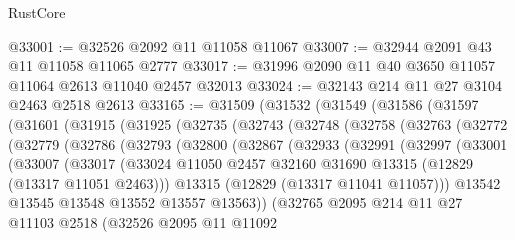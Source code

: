 \begin{lexlean}{RustCore}
\begin{coremodule}
@33001 := @32526 @2092 @11 @11058 @11067
@33007 := @32944 @2091 @43 @11 @11058 @11065 @2777
@33017 := @31996 @2090 @11 @40 @3650 @11057 @11064 @2613 @11040 @2457 @32013
@33024 := @32143 @214 @11 @27 @3104 @2463 @2518 @2613
@33165 := @31509
    (@31532
      (@31549
        (@31586
          (@31597
            (@31601
              (@31915
                (@31925
                  (@32735
                    (@32743
                      (@32748
                        (@32758
                          (@32763
                            (@32772
                              (@32779
                                (@32786
                                  (@32793
                                    (@32800
                                      (@32867
                                        (@32933
                                          (@32991
                                            (@32997
                                              (@33001
                                                (@33007
                                                  (@33017
                                                    (@33024
                                                      @11050
                                                      @2457
                                                      @32160
                                                      @31690
                                                      @13315
                                                      (@12829 (@13317 @11051 @2463)))
                                                    @13315
                                                    (@12829 (@13317 @11041 @11057)))
                                                  @13542
                                                  @13545
                                                  @13548
                                                  @13552
                                                  @13557
                                                  @13563))
                                              (@32765
                                                @2095
                                                @214
                                                @11
                                                @27
                                                @11103
                                                @2518
                                                (@32526
                                                  @2095
                                                  @11
                                                  @11092

\end{coremodule}
\end{lexlean}
